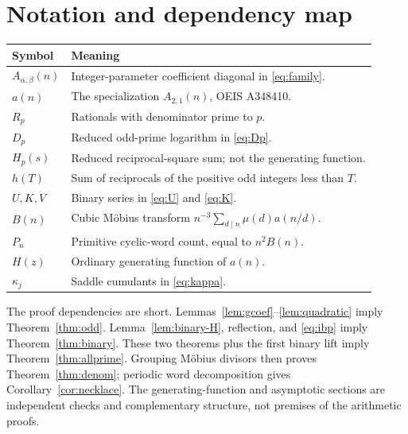 \documentclass[11pt,a4paper]{article}
\numberwithin{equation}{section}
\theoremstyle{definition}
\theoremstyle{remark}
\newcommand{\A}{A_{\alpha,\beta}}
\begin{document}
\section{Notation and dependency map}
\begin{center}
\small
\begin{tabular}{p{}p{}}
\toprule
Symbol & Meaning\\
\midrule
$\A(n)$ & Integer-parameter coefficient diagonal in \eqref{eq:family}.\\
$a(n)$ & The specialization $A_{2,1}(n)$, OEIS A348410.\\
$R_p$ & Rationals with denominator prime to $p$.\\
$D_p$ & Reduced odd-prime logarithm in \eqref{eq:Dp}.\\
$H_p(s)$ & Reduced reciprocal-square sum; not the generating function.\\
$h(T)$ & Sum of reciprocals of the positive odd integers less than $T$.\\
$U,K,V$ & Binary series in \eqref{eq:U} and \eqref{eq:K}.\\
$B(n)$ & Cubic M\"obius transform $n^{-3}\sum_{d\mid n}\mu(d)a(n/d)$.\\
$P_n$ & Primitive cyclic-word count, equal to $n^2B(n)$.\\
$H(z)$ & Ordinary generating function of $a(n)$.\\
$\kappa_j$ & Saddle cumulants in \eqref{eq:kappa}.\\
\bottomrule
\end{tabular}
\end{center}
The proof dependencies are short. Lemmas~\ref{lem:gcoef}--\ref{lem:quadratic}
imply Theorem~\ref{thm:odd}. Lemma~\ref{lem:binary-H}, reflection, and
\eqref{eq:ibp} imply Theorem~\ref{thm:binary}. These two theorems plus the
first binary lift imply Theorem~\ref{thm:allprime}. Grouping M\"obius divisors
then proves Theorem~\ref{thm:denom}; periodic word decomposition gives
Corollary~\ref{cor:necklace}. The generating-function and asymptotic sections
are independent checks and complementary structure, not premises of the
arithmetic proofs.
\end{document}
